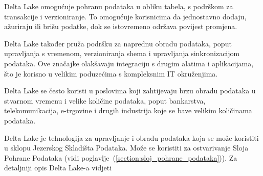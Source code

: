 Delta Lake omogućuje pohranu podataka u obliku tabela, s podrškom za transakcije
i verzioniranje. To omogućuje korisnicima da jednostavno dodaju, ažuriraju ili
brišu podatke, dok se istovremeno održava povijest promjena.

Delta Lake također pruža podršku za naprednu obradu podataka, poput upravljanja
s vremenom, verzioniranja shema i upravljanja sinkronizacijom podataka. Ove
značajke olakšavaju integraciju s drugim alatima i aplikacijama, što je korisno
u velikim poduzećima s kompleksnim IT okruženjima.

Delta Lake se često koristi u poslovima koji zahtijevaju brzu obradu podataka u
stvarnom vremenu i velike količine podataka, poput bankarstva, telekomunikacija,
e-trgovine i drugih industrija koje se bave velikim količinama podataka.

Delta Lake je tehnologija za upravljanje i obradu podataka koja se može
koristiti u sklopu Jezerskog Skladišta Podataka. Može se koristiti za
ostvarivanje Sloja Pohrane Podataka (vidi
poglavlje~(\ref{section:sloj_pohrane_podataka})). Za detaljniji opis Delta
Lake-a vidjeti
\cite{deltalake2023}
